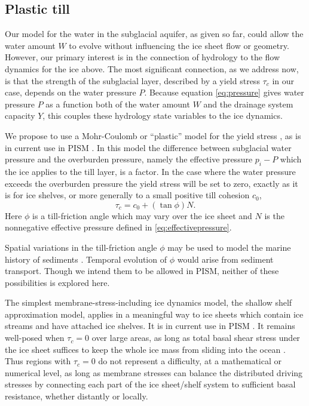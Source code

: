 \documentclass[11pt]{amsart}
\begin{document}
\subsection*{Plastic till}  Our model for the water in the subglacial aquifer, as given so far, could allow the water amount $W$ to evolve without influencing the ice sheet flow or geometry.  However, our primary interest is in the connection of hydrology to the flow dynamics for the ice above.  The most significant connection, as we address now, is that the strength of the subglacial layer, described by a yield stress $\tau_c$ in our case, depends on the water pressure $P$.  Because equation \eqref{eq:pressure} gives water pressure $P$ as a function both of the water amount $W$ and the drainage system capacity $Y$, this couples these hydrology state variables to the ice dynamics.

We propose to use a Mohr-Coulomb or ``plastic'' model for the yield stress \citep{Clarke05, SchoofStream, SchoofTill}, as is in current use in PISM \citep{BBssasliding}.  In this model the difference between subglacial water pressure and the overburden pressure, namely the effective pressure $p_i - P$ which the ice applies to the till layer, is a factor.  In the case where the water pressure exceeds the overburden pressure the yield stress will be set to zero, exactly as it is for ice shelves, or more generally to a small positive till cohesion $c_0$,
\begin{equation} \label{eq:mohr-coulomb}
  \tau_c = c_0 + (\tan{\phi}) N.
\end{equation}
Here $\phi$ is a till-friction angle which may vary over the ice sheet and $N$ is the nonnegative effective pressure defined in \eqref{eq:effectivepressure}.

Spatial variations in the till-friction angle $\phi$ may be used to model the marine history of sediments \citep[e.g.][]{Martinetal2011}.  Temporal evolution of $\phi$ would arise from sediment transport.  Though we intend them to be allowed in PISM, neither of these possibilities is explored here.

The simplest membrane-stress-including ice dynamics model, the shallow shelf approximation \citep{SchoofStream,WeisGreveHutter} model, applies in a meaningful way to ice sheets which contain ice streams and have attached ice shelves.  It is in current use in PISM \citep{BBssasliding}.  It remains well-posed when $\tau_c=0$ over large areas, as long as total basal shear stress under the ice sheet suffices to keep the whole ice mass from sliding into the ocean \citep{SchoofStream}.  Thus regions with $\tau_c=0$ do not represent a difficulty, at a mathematical or numerical level, as long as membrane stresses can balance the distributed driving stresses by connecting each part of the ice sheet/shelf system to sufficient basal resistance, whether distantly or locally.
\end{document}
